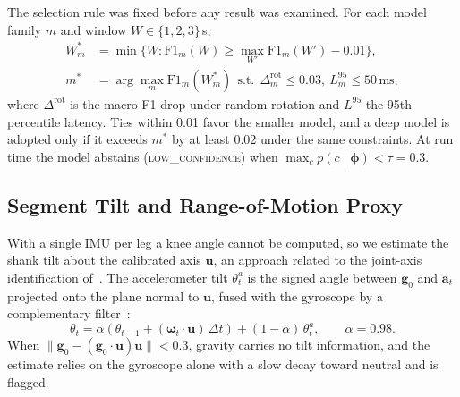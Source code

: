 \documentclass[conference]{IEEEtran}
\newcommand{\vect}[1]{\mathbf{#1}}
\begin{document}
The selection rule was fixed before any result was examined. For each model family $m$ and window $W\in\{1,2,3\}$\,s,
\begin{equation}
\begin{aligned}
W^{*}_m&=\min\{W:\mathrm{F1}_m(W)\ge\max_{W'}\mathrm{F1}_m(W')-0.01\},\\
m^{*}&=\arg\max_m \mathrm{F1}_m(W^{*}_m)\ \ \text{s.t.}\ \ \Delta^{\mathrm{rot}}_m\le0.03,\ L^{95}_m\le50\,\text{ms},
\end{aligned}
\label{eq:rule}
\end{equation}
where $\Delta^{\mathrm{rot}}$ is the macro-F1 drop under random rotation and $L^{95}$ the 95th-percentile latency. Ties within 0.01 favor the smaller model, and a deep model is adopted only if it exceeds $m^{*}$ by at least 0.02 under the same constraints. At run time the model abstains (\textsc{low\_confidence}) when $\max_c p(c\mid\boldsymbol{\phi})<\tau=0.3$.

\subsection{Segment Tilt and Range-of-Motion Proxy}
With a single IMU per leg a knee angle cannot be computed, so we estimate the shank tilt about the calibrated axis $\vect{u}$, an approach related to the joint-axis identification of~\cite{seel2014}. The accelerometer tilt $\theta^{a}_t$ is the signed angle between $\vect{g}_0$ and $\vect{a}_t$ projected onto the plane normal to $\vect{u}$, fused with the gyroscope by a complementary filter~\cite{mahony2008}:
\begin{equation}
\theta_t=\alpha\left(\theta_{t-1}+(\boldsymbol{\omega}_t\!\cdot\!\vect{u})\,\Delta t\right)+(1-\alpha)\,\theta^{a}_t,\qquad \alpha=0.98.
\label{eq:tilt}
\end{equation}
When $\lVert\vect{g}_0-(\vect{g}_0\!\cdot\!\vect{u})\vect{u}\rVert<0.3$, gravity carries no tilt information, and the estimate relies on the gyroscope alone with a slow decay toward neutral and is flagged.
\end{document}
